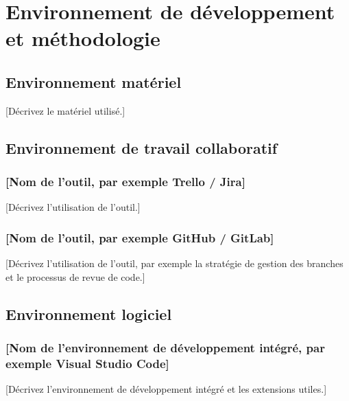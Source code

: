 \chapter{Environnement de développement et méthodologie}

\minitoc

\section{Environnement matériel}
[Décrivez le matériel utilisé.]

\section{Environnement de travail collaboratif}

\subsection{[Nom de l'outil, par exemple Trello / Jira]}
[Décrivez l'utilisation de l'outil.]

\subsection{[Nom de l'outil, par exemple GitHub / GitLab]}
[Décrivez l'utilisation de l'outil, par exemple la stratégie de gestion des branches et le processus de revue de code.]

\section{Environnement logiciel}

\subsection{[Nom de l'environnement de développement intégré, par exemple Visual Studio Code]}
[Décrivez l'environnement de développement intégré et les extensions utiles.]

